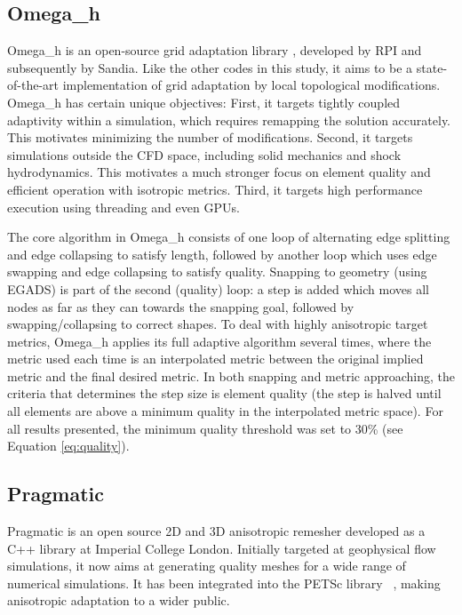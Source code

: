 \documentclass[3p,times,procedia,number]{elsarticle}
\begin{document}
\subsection{Omega\_h}

Omega\_h is an open-source grid adaptation library
\cite{ibanez-phd-thesis-heterogeneous-adapt,
ibanez-shephard-moving-shared-mem,
omega_h-website}, developed by RPI and subsequently by Sandia.
Like the other codes in this study, it aims to be a state-of-the-art
implementation of grid adaptation by local topological modifications.
Omega\_h has certain unique objectives:
First, it targets tightly coupled adaptivity within a simulation,
which requires remapping the solution accurately.
This motivates minimizing the number of modifications.
Second, it targets simulations outside the CFD space, including
solid mechanics and shock hydrodynamics.
This motivates a much stronger focus on element quality
and efficient operation with isotropic metrics.
Third, it targets high performance execution using threading
and even GPUs.

The core algorithm in Omega\_h consists of one loop of alternating
edge splitting and edge collapsing to satisfy length, followed by another loop
which uses edge swapping and edge collapsing to satisfy quality.
Snapping to geometry (using EGADS) is part of the second (quality) loop:
a step is added which moves all nodes as far as they can towards
the snapping goal, followed by swapping/collapsing to correct shapes.
To deal with highly anisotropic target metrics, Omega\_h applies
its full adaptive algorithm several times, where the metric used
each time is an interpolated metric between the original implied metric
and the final desired metric.
In both snapping and metric approaching, the criteria that determines
the step size is element quality (the step is halved until all elements
are above a minimum quality in the interpolated metric space).
For all results presented, the minimum quality threshold was set to 30\%
(see Equation \ref{eq:quality}).

\subsection{Pragmatic}

Pragmatic\cite{pragmatic-website,Gorman-2015} is an open source 2D and
3D anisotropic remesher developed as a C++ library at Imperial College
London.  Initially targeted at geophysical flow simulations, it now
aims at generating quality meshes for a wide range of numerical
simulations. It has been integrated into the PETSc library
~\cite{petsc-user-ref,Barral-2016}, making anisotropic adaptation to a
wider public.
\end{document}
